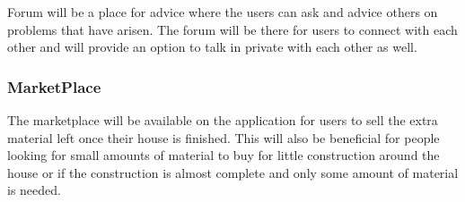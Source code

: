 \documentclass[12pt]{report}
\begin{document}
Forum will be a place for advice where the users can ask and advice others on problems that have arisen. The forum will be there for users to connect with each other and will provide an option to talk in private with each other as well. 

\subsubsection*{MarketPlace}

The marketplace will be available on the application for users to sell the extra material left once their house is finished. This will also be beneficial for people looking for small amounts of material to buy for little construction around the house or if the construction is almost complete and only some amount of material is needed. 
\end{document}
